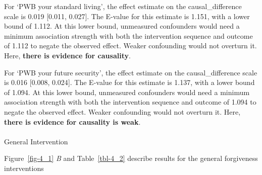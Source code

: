 \documentclass[
  single column]{article}
\makeatletter
\let\oldparagraph\paragraph
\renewcommand{\paragraph}{
    \@ifstar
      \xxxParagraphStar
      \xxxParagraphNoStar
  }
\newcommand{\xxxParagraphStar}[1]{\oldparagraph*{#1}\mbox{}}
\newcommand{\xxxParagraphNoStar}[1]{\oldparagraph{#1}\mbox{}}
\makeatother
\begin{document}
For `PWB your standard living', the effect estimate on the
causal\_difference scale is 0.019 {[}0.011, 0.027{]}. The E-value for
this estimate is 1.151, with a lower bound of 1.112. At this lower
bound, unmeasured confounders would need a minimum association strength
with both the intervention sequence and outcome of 1.112 to negate the
observed effect. Weaker confounding would not overturn it. Here,
\textbf{there is evidence for causality}.

For `PWB your future security', the effect estimate on the
causal\_difference scale is 0.016 {[}0.008, 0.024{]}. The E-value for
this estimate is 1.137, with a lower bound of 1.094. At this lower
bound, unmeasured confounders would need a minimum association strength
with both the intervention sequence and outcome of 1.094 to negate the
observed effect. Weaker confounding would not overturn it. Here,
\textbf{there is evidence for causality is weak}.

\paragraph{General Intervention}\label{general-intervention-3}

Figure~\ref{fig-4_1} \emph{B} and Table~\ref{tbl-4_2} describe results
for the general forgiveness interventions
\end{document}
